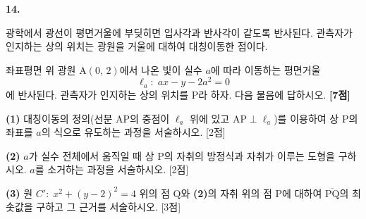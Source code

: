 \documentclass[10pt]{article}
\renewenvironment{problem}[2]{%
  \par%
  \setcounter{probnum}{#1}%
  \noindent
  \begin{minipage}[t]{\linewidth}%
  \setlength{\parskip}{4pt plus 1pt}%
  {\sffamily\bfseries\large\color{black}#1.}\par\smallskip\ignorespaces
}{%
  \end{minipage}\par%
}
\newcommand{\pts}[1]{\nobreak\hspace*{\fill}\textbf{[#1점]}\par}
\begin{document}
\begin{minipage}[t][\probboxheight][t]{0.46\linewidth}\raggedright
\begin{problem}{14}{s}
광학에서 광선이 평면거울에 부딪히면 입사각과 반사각이 같도록 반사된다. 관측자가 인지하는 상의 위치는 광원을 거울에 대하여 대칭이동한 점이다.

\vspace{2mm}

좌표평면 위 광원 $\mathrm{A}(0,\,2)$에서 나온 빛이 실수 $a$에 따라 이동하는 평면거울
$$\ell_{a}:\; ax-y-2a^{2}=0$$
에 반사된다. 관측자가 인지하는 상의 위치를 $\mathrm{P}$라 하자. 다음 물음에 답하시오. \pts{7}

\vspace{2mm}

\textbf{(1)} 대칭이동의 정의(선분 $\mathrm{AP}$의 중점이 $\ell_{a}$ 위에 있고 $\mathrm{AP}\perp\ell_{a}$)를 이용하여 상 $\mathrm{P}$의 좌표를 $a$의 식으로 유도하는 과정을 서술하시오. \nolinebreak\hspace*{\fill}\mbox{[2점]}
\vspace{30mm}

\textbf{(2)} $a$가 실수 전체에서 움직일 때 상 $\mathrm{P}$의 자취의 방정식과 자취가 이루는 도형을 구하시오. $a$를 소거하는 과정을 서술하시오. \nolinebreak\hspace*{\fill}\mbox{[2점]}
\vspace{30mm}

\textbf{(3)} 원 $C':\;x^{2}+(y-2)^{2}=4$ 위의 점 $\mathrm{Q}$와 \textbf{(2)}의 자취 위의 점 $\mathrm{P}$에 대하여 $\overline{\mathrm{PQ}}$의 최솟값을 구하고 그 근거를 서술하시오. \nolinebreak\hspace*{\fill}\mbox{[3점]}
\vspace{30mm}
\end{problem}
\end{minipage}

\clearpage
\end{document}
